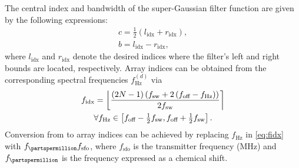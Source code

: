 The central index and bandwidth of the super-Gaussian filter function are given
by the following expressions:
\begin{subequations}
    \begin{gather}
        c = \tfrac{1}{2} \left(l_{\text{idx}} + r_{\text{idx}}\right), \\
        b = l_{\text{idx}} - r_{\text{idx}},
    \end{gather}
\end{subequations}
where $l_{\text{idx}}$ and $r_{\text{idx}}$ denote the desired
indices where the filter's left and right bounds are located, respectively.
Array indices can be obtained from the corresponding spectral frequencies
$f^{(d)}_{\unit{\hertz}}$ via
\begin{equation}
    \begin{gathered}
        f_{\text{idx}} =
            \left \lfloor
                \frac
                {
                    \left(2N - 1\right)
                    \left(\fsw + 2 \left(\foff - f_{\unit{\hertz}}\right) \right)
                }
                {2 \fsw}
            \right \rceil \\
        \forall f_{\unit{\hertz}} \in
            \left[\foff - \tfrac{1}{2} \fsw, \foff + \tfrac{1}{2} \fsw\right].
        \label{eq:fidx}
    \end{gathered}
\end{equation}
Conversion from \unit{\partspermillion} to array indices can be achieved by
replacing  $f_{\unit{\hertz}}$ in \eqref{eq:fidx} with
$f_{\unit{\partspermillion}} f_{\text{sfo}}$, where $f_{\text{sfo}}$ is the
transmitter frequency (\unit{\mega \hertz}) and $f_{\unit{\partspermillion}}$
is the frequency expressed as a chemical shift.

